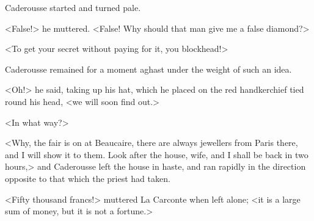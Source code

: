  Caderousse started and turned pale. 

 <False!> he muttered. <False! Why should that man give me a false diamond?>

<To get your secret without paying for it, you blockhead!> 

 Caderousse remained for a moment aghast under the weight of such an idea. 

 <Oh!> he said, taking up his hat, which he placed on the red handkerchief tied round his head, <we will soon find out.> 

 <In what way?> 

 <Why, the fair is on at Beaucaire, there are always jewellers from Paris there, and I will show it to them. Look after the house, wife, and I shall be back in two hours,> and Caderousse left the house in haste, and ran rapidly in the direction opposite to that which the priest had taken. 

 <Fifty thousand francs!> muttered La Carconte when left alone; <it is a large sum of money, but it is not a fortune.> 